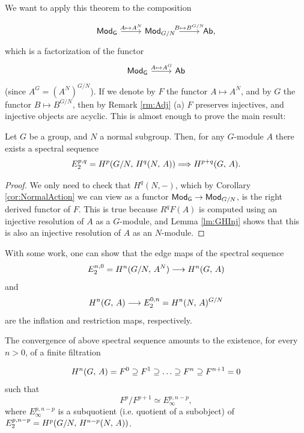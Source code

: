 \documentclass[a4paper, oneside]{memoir}
\begin{document}
\noindent We want to apply this theorem to the composition

\[
	\begin{tikzcd}
		\Gmod \arrow[r, "A\mapsto A^N"] & \mathsf{Mod}_{G/N} \arrow[r, "B\mapsto B^{G/N}"] & \Ab,
	\end{tikzcd}
\]
which is a factorization of the functor
\[
	\begin{tikzcd}
		\Gmod \arrow[r, "A\mapsto A^G"] & \Ab
	\end{tikzcd}
\]
(since $A^G = (A^N)^{G/N}$). If we denote by $F$ the functor $A\mapsto A^N$, and by $G$ the functor $B\mapsto B^{G/N}$, then by Remark \ref{rm:Adj} (a) $F$ preserves injectives, and injective objects are acyclic. This is almost enough to prove the main result:

\begin{theorem}\label{thm:HS}
	Let $G$ be a group, and $N$ a normal subgroup. Then, for any $G$-module $A$ there exists a spectral sequence
	\[
		E_2^{p,q} = H^{p}( G/N, \, H^{q}( N, \, A ) ) \Longrightarrow H^{p+q}( G, \, A )
		.\]
\end{theorem}

\begin{proof}
	We only need to check that $H^q(N,-)$, which by Corollary \ref{cor:NormalAction} we can view as a functor $\mathsf{Mod}_\mathsf{G} \to \mathsf{Mod}_{G/N}$, is the right derived functor of $F$. This is true because $R^qF(A)$ is computed using an injective resolution of $A$ as a $G$-module, and Lemma \ref{lm:GHInj} shows that this is also an injective resolution of $A$ as an $N$-module.
\end{proof}

\begin{remark}
	With some work, one can show that the edge maps of the spectral sequence
	\[
		E_2^{n,0}=H^{n}( G /N, \, A^N ) \longrightarrow H^{n}( G, \, A )
	\]
	and
	\[
		H^{n}( G, \, A ) \longrightarrow E_2^{0,n} = H^{n}( N, \, A )^{G/N}
	\]
	are the inflation and restriction maps, respectively.
\end{remark}

The convergence of above spectral sequence amounts to the existence, for every $n>0$, of a finite filtration

\[
	H^{n}( G, \, A )=F^0\supseteq F^1\supseteq\ldots\supseteq F^n\supseteq F^{n+1}=0
\]
such that
\begin{equation}\label{eq:Convergence}
	F^p/F^{p+1} \simeq E_\infty^{p,n-p},
\end{equation}
where $E_\infty^{p,n-p}$ is a subquotient (i.e. quotient of a subobject) of $E_2^{p,n-p}= H^{p}( G/N, \, H^{n-p}( N, \, A ) )$.
\end{document}
